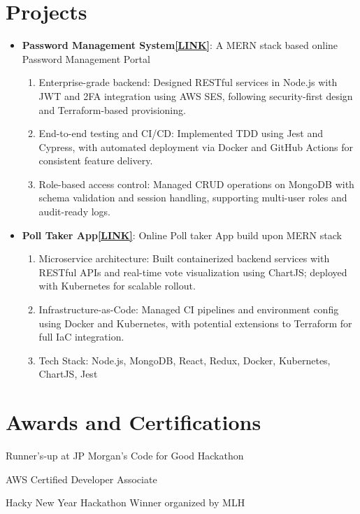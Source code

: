 \documentclass[a4paper,20pt]{article}
\newcommand{\resumeItem}[2]{
  \item\small{
    \textbf{#1}{: #2 \vspace{-2pt}}
  }
}
\newcommand{\resumeSubItem}[2]{\resumeItem{#1}{#2}\vspace{-3pt}}
\newcommand{\resumeSubHeadingListStart}{\begin{itemize}[leftmargin=*]}
\newcommand{\resumeSubHeadingListEnd}{\end{itemize}}
\begin{document}
\section{Projects}
\resumeSubHeadingListStart
\resumeSubItem{{\faExternalLink Password Management System}\href{https://www.youtube.com/watch?v=1LP-bFeBr5k}{[LINK]}}{A MERN stack based online Password Management Portal}\begin{enumerate}
    \item Enterprise-grade backend: Designed RESTful services in Node.js with JWT and 2FA integration using AWS SES, following security-first design and Terraform-based provisioning.
    \item End-to-end testing and CI/CD: Implemented TDD using Jest and Cypress, with automated deployment via Docker and GitHub Actions for consistent feature delivery.
    \item Role-based access control: Managed CRUD operations on MongoDB with schema validation and session handling, supporting multi-user roles and audit-ready logs.
\end{enumerate}
\vspace{-4pt}
\resumeSubItem{{\faExternalLink Poll Taker App}\href{https://github.com/bhavukkalra/poll_taker}{[LINK]}}{Online Poll taker App build upon MERN stack}\begin{enumerate}
    \item Microservice architecture: Built containerized backend services with RESTful APIs and real-time vote visualization using ChartJS; deployed with Kubernetes for scalable rollout.
    \item Infrastructure-as-Code: Managed CI pipelines and environment config using Docker and Kubernetes, with potential extensions to Terraform for full IaC integration.
    \item Tech Stack: Node.js, MongoDB, React, Redux, Docker, Kubernetes, ChartJS, Jest
\end{enumerate}

\vspace{-4pt}



\resumeSubHeadingListEnd
\vspace{-4pt}
\section{Awards and Certifications}
\begin{description}[font=$\bullet$]
\item {Runner's-up at JP Morgan's Code for Good Hackathon}
\vspace{-5pt}
\item {AWS Certified Developer Associate}
\vspace{-5pt}
\item {Hacky New Year Hackathon Winner organized by MLH}

\end{description}
\end{document}
